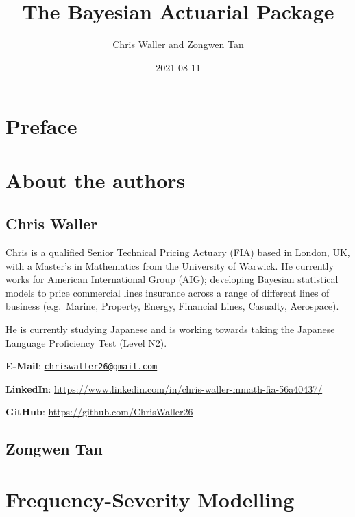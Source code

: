 \documentclass[
]{book}
\title{The Bayesian Actuarial Package}
\author{Chris Waller and Zongwen Tan}
\date{2021-08-11}
\begin{document}
\maketitle

{
\setcounter{tocdepth}{1}
\tableofcontents
}
\hypertarget{preface}{%
\chapter{Preface}\label{preface}}

\hypertarget{about-the-authors}{%
\chapter{About the authors}\label{about-the-authors}}

\hypertarget{chris-waller}{%
\section{Chris Waller}\label{chris-waller}}

Chris is a qualified Senior Technical Pricing Actuary (FIA) based in London, UK, with a Master's in Mathematics from the University of Warwick. He currently works for American International Group (AIG); developing Bayesian statistical models to price commercial lines insurance across a range of different lines of business (e.g.~Marine, Property, Energy, Financial Lines, Casualty, Aerospace).

He is currently studying Japanese and is working towards taking the Japanese Language Proficiency Test (Level N2).

\textbf{E-Mail}: \href{mailto:chriswaller26@gmail.com}{\nolinkurl{chriswaller26@gmail.com}}

\textbf{LinkedIn}: \url{https://www.linkedin.com/in/chris-waller-mmath-fia-56a40437/}

\textbf{GitHub}: \url{https://github.com/ChrisWaller26}

\hypertarget{zongwen-tan}{%
\section{Zongwen Tan}\label{zongwen-tan}}

\hypertarget{frequency-severity-modelling}{%
\chapter{Frequency-Severity Modelling}\label{frequency-severity-modelling}}
\end{document}
